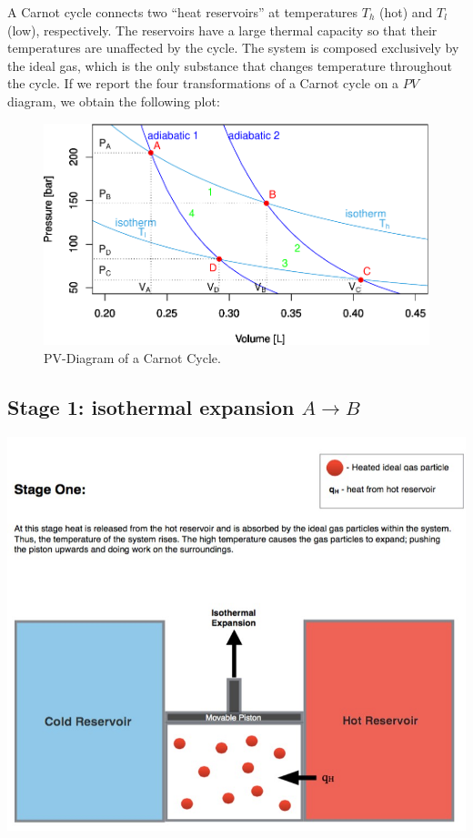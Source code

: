 \documentclass[
]{book}
\theoremstyle{definition}
\theoremstyle{definition}
\theoremstyle{definition}
\theoremstyle{remark}
\begin{document}
A Carnot cycle connects two ``heat reservoirs'' at temperatures \(T_h\) (hot) and \(T_l\) (low), respectively. The reservoirs have a large thermal capacity so that their temperatures are unaffected by the cycle. The system is composed exclusively by the ideal gas, which is the only substance that changes temperature throughout the cycle. If we report the four transformations of a Carnot cycle on a \(PV\) diagram, we obtain the following plot:

\begin{figure}

{\centering \includegraphics{pchem1_files/figure-latex/FigCarnotPV-1} 

}

\caption{PV-Diagram of a Carnot Cycle.}\label{fig:FigCarnotPV}
\end{figure}

\hypertarget{CCstage1}{%
\subsection{\texorpdfstring{Stage 1: isothermal expansion \(A \rightarrow B\)}{Stage 1: isothermal expansion A \textbackslash rightarrow B}}\label{CCstage1}}

\begin{center}\includegraphics[width=0.7\linewidth]{./img/OEP_Figures.007a} \end{center}
\end{document}
